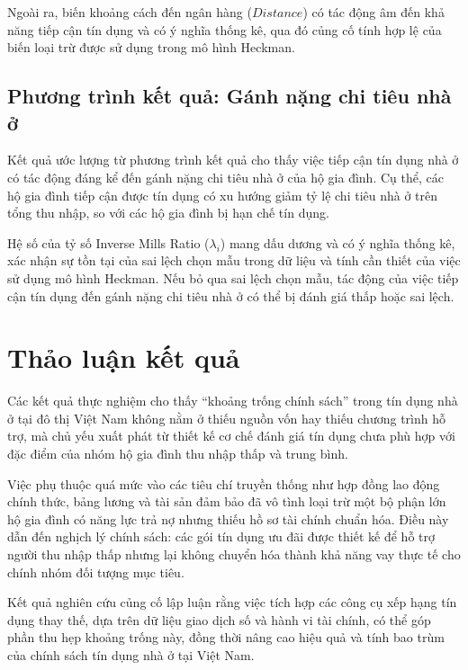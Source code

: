 \documentclass[12pt,a4paper]{report}
\begin{document}
Ngoài ra, biến khoảng cách đến ngân hàng ($Distance$) có tác động âm đến khả năng tiếp cận tín dụng và có ý nghĩa thống kê, qua đó củng cố tính hợp lệ của biến loại trừ được sử dụng trong mô hình Heckman.

\subsection{Phương trình kết quả: Gánh nặng chi tiêu nhà ở}

Kết quả ước lượng từ phương trình kết quả cho thấy việc tiếp cận tín dụng nhà ở có tác động đáng kể đến gánh nặng chi tiêu nhà ở của hộ gia đình. Cụ thể, các hộ gia đình tiếp cận được tín dụng có xu hướng giảm tỷ lệ chi tiêu nhà ở trên tổng thu nhập, so với các hộ gia đình bị hạn chế tín dụng.

Hệ số của tỷ số Inverse Mills Ratio ($\lambda_i$) mang dấu dương và có ý nghĩa thống kê, xác nhận sự tồn tại của sai lệch chọn mẫu trong dữ liệu và tính cần thiết của việc sử dụng mô hình Heckman. Nếu bỏ qua sai lệch chọn mẫu, tác động của việc tiếp cận tín dụng đến gánh nặng chi tiêu nhà ở có thể bị đánh giá thấp hoặc sai lệch.

\section{Thảo luận kết quả}

Các kết quả thực nghiệm cho thấy ``khoảng trống chính sách'' trong tín dụng nhà ở tại đô thị Việt Nam không nằm ở thiếu nguồn vốn hay thiếu chương trình hỗ trợ, mà chủ yếu xuất phát từ thiết kế cơ chế đánh giá tín dụng chưa phù hợp với đặc điểm của nhóm hộ gia đình thu nhập thấp và trung bình.

Việc phụ thuộc quá mức vào các tiêu chí truyền thống như hợp đồng lao động chính thức, bảng lương và tài sản đảm bảo đã vô tình loại trừ một bộ phận lớn hộ gia đình có năng lực trả nợ nhưng thiếu hồ sơ tài chính chuẩn hóa. Điều này dẫn đến nghịch lý chính sách: các gói tín dụng ưu đãi được thiết kế để hỗ trợ người thu nhập thấp nhưng lại không chuyển hóa thành khả năng vay thực tế cho chính nhóm đối tượng mục tiêu.

Kết quả nghiên cứu củng cố lập luận rằng việc tích hợp các công cụ xếp hạng tín dụng thay thế, dựa trên dữ liệu giao dịch số và hành vi tài chính, có thể góp phần thu hẹp khoảng trống này, đồng thời nâng cao hiệu quả và tính bao trùm của chính sách tín dụng nhà ở tại Việt Nam.

\end{document}
